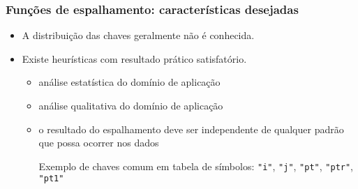 \documentclass{beamer}
\begin{document}
\begin{frame}

\frametitle{Funções de espalhamento: características desejadas}

\begin{itemize}

  \item A distribuição das chaves \alert{geralmente} não é conhecida.

  \item Existe heurísticas com resultado prático satisfatório.

    \begin{itemize}

      \item análise estatística do domínio de aplicação

      \item análise qualitativa do domínio de aplicação

      \item o resultado do espalhamento deve ser independente de qualquer padrão
        que possa ocorrer nos dados

        Exemplo de chaves comum em tabela de símbolos:
        \texttt{"i"}, \texttt{"j"}, \texttt{"pt"}, \texttt{"ptr"}, \texttt{"pt1"}

    \end{itemize}

\end{itemize}

\end{frame}
\end{document}
